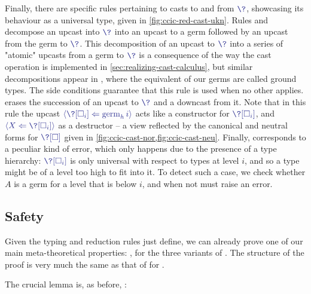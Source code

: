 Finally, there are specific rules pertaining to casts to and from $\tcol{\?}$,
showcasing its behaviour as a universal type, given in \cref{fig:ccic-red-cast-ukn}.
Rules  and  decompose an upcast into
$\tcol{\?}$ into an upcast to a germ followed by an upcast from the germ to $\tcol{\?}$.
This decomposition of an upcast to $\tcol{\?}$ into a series of "atomic" upcasts from a germ to
$\tcol{\?}$ is a consequence of the way the cast operation is implemented in
\cref{sec:realizing-cast-calculus}, but similar decompositions appear \eg in ,
where the equivalent of our germs are called ground types.
The side conditions guarantee that this rule is used when no other applies.
%
 erases the succession of an upcast to $\tcol{\?}$
and a downcast from it. Note that in this rule the upcast
$\tcol{\castrev{}{\stalkCIC{h}{i}}{\?[\uni[i]]}}$ acts like a constructor for
$\tcol{\?[\uni[i]]}$, and $\tcol{\castrev{}{\?[\uni[i]]}{X}}$ as a destructor –
a view reflected by the canonical and neutral forms for $\tcol{\?[\uni]}$ given in
\cref{fig:ccic-cast-nor,fig:ccic-cast-neu}.%
%
%
Finally,  corresponds to a peculiar kind of error, which only happens due to the presence of a type hierarchy: 
$\tcol{\?[\uni[i]]}$ is only universal with respect to types at level $i$, and so a type might
be of a level too high to fit into it.
To detect such a case, we check whether $A$ is a germ for a level that is below $i$,
and when not must raise an error.

\subsection{Safety}

Given the typing and reduction rules just define, we can already prove one of our main
meta-theoretical properties:
, for the three variants of .
The structure of the proof is very much the same as that of  for
.

%
The crucial lemma is, as before, :

